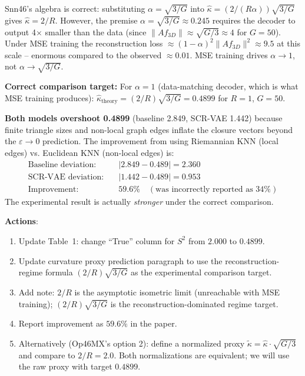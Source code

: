 \documentclass{article}
\begin{document}
\begin{correct}
Snn46's algebra is correct: substituting $\alpha = \sqrt{3/G}$ into
$\hat{\kappa} = (2/(R\alpha))\sqrt{3/G}$ gives $\hat{\kappa} = 2/R$. However,
the premise $\alpha = \sqrt{3/G} \approx 0.245$ requires the decoder to output
4$\times$ smaller than the data (since $\|Af_{3D}\| \approx \sqrt{G/3} \approx 4$
for $G=50$). Under MSE training the reconstruction loss $\approx (1-\alpha)^2
\|Af_{3D}\|^2 \approx 9.5$ at this scale -- enormous compared to the observed
$\approx 0.01$. MSE training drives $\alpha \to 1$, not $\alpha \to \sqrt{3/G}$.

\textbf{Correct comparison target:} For $\alpha = 1$ (data-matching decoder,
which is what MSE training produces): $\hat{\kappa}_{\mathrm{theory}} =
(2/R)\sqrt{3/G} = 0.4899$ for $R=1$, $G=50$.

\textbf{Both models overshoot 0.4899} (baseline 2.849, SCR-VAE 1.442) because
finite triangle sizes and non-local graph edges inflate the closure vectors
beyond the $\varepsilon \to 0$ prediction. The improvement from using
Riemannian KNN (local edges) vs. Euclidean KNN (non-local edges) is:
\begin{align*}
  \text{Baseline deviation:} &\quad |2.849 - 0.489| = 2.360 \\
  \text{SCR-VAE deviation:} &\quad |1.442 - 0.489| = 0.953 \\
  \text{Improvement:} &\quad 59.6\% \quad (\text{was incorrectly reported as } 34\%)
\end{align*}
The experimental result is actually \emph{stronger} under the correct comparison.

\textbf{Actions}:
\begin{enumerate}
  \item Update Table~1: change ``True'' column for $S^2$ from $2.000$ to $0.4899$.
  \item Update curvature proxy prediction paragraph to use the reconstruction-regime
    formula $(2/R)\sqrt{3/G}$ as the experimental comparison target.
  \item Add note: $2/R$ is the asymptotic isometric limit (unreachable with MSE
    training); $(2/R)\sqrt{3/G}$ is the reconstruction-dominated regime target.
  \item Report improvement as $59.6\%$ in the paper.
  \item Alternatively (Op46MX's option 2): define a normalized proxy
    $\tilde{\kappa} = \hat{\kappa} \cdot \sqrt{G/3}$ and compare to $2/R = 2.0$.
    Both normalizations are equivalent; we will use the raw proxy with target $0.4899$.
\end{enumerate}
\end{correct}
\end{document}
